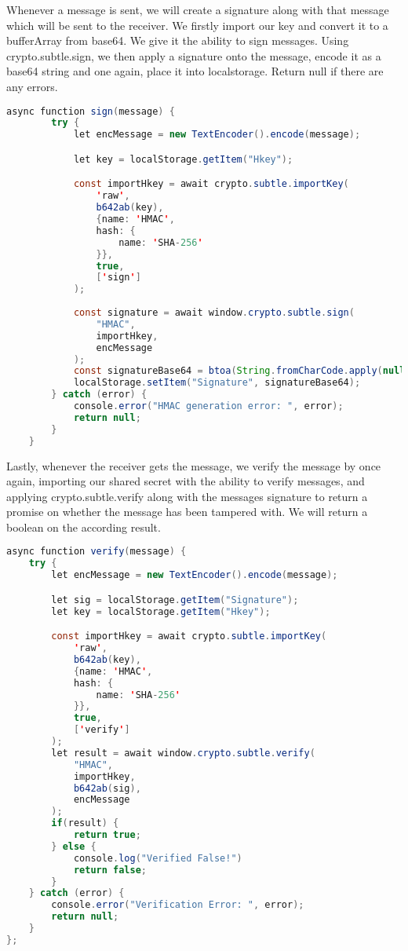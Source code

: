 \documentclass{article}
\begin{document}
Whenever a message is sent, we will create a signature along with that message which will be sent to the receiver. We firstly import our key and convert it to a bufferArray from base64. We give it the ability to sign messages. Using crypto.subtle.sign, we then apply a signature onto the message, encode it as a base64 string and one again, place it into localstorage. Return null if there are any errors.

\begin{lstlisting}[language=Java]
    async function sign(message) {
        try {
            let encMessage = new TextEncoder().encode(message);

            let key = localStorage.getItem("Hkey");

            const importHkey = await crypto.subtle.importKey(
                'raw',
                b642ab(key),
                {name: 'HMAC',
                hash: {
                    name: 'SHA-256'
                }},
                true,
                ['sign']
            );
            
            const signature = await window.crypto.subtle.sign(
                "HMAC",
                importHkey,
                encMessage
            );
            const signatureBase64 = btoa(String.fromCharCode.apply(null, [...new Uint8Array(signature)]));
            localStorage.setItem("Signature", signatureBase64);
        } catch (error) {
            console.error("HMAC generation error: ", error);
            return null; 
        }
    }
\end{lstlisting}


Lastly, whenever the receiver gets the message, we verify the message by once again, importing our shared secret with the ability to verify messages, and applying crypto.subtle.verify along with the messages signature to return a promise on whether the message has been tampered with. We will return a boolean on the according result.

\begin{lstlisting}[language=Java]
async function verify(message) {
    try {
        let encMessage = new TextEncoder().encode(message);

        let sig = localStorage.getItem("Signature");
        let key = localStorage.getItem("Hkey");

        const importHkey = await crypto.subtle.importKey(
            'raw',
            b642ab(key),
            {name: 'HMAC',
            hash: {
                name: 'SHA-256'
            }},
            true,
            ['verify']
        );
        let result = await window.crypto.subtle.verify(
            "HMAC",
            importHkey,
            b642ab(sig),
            encMessage
        );
        if(result) {
            return true;
        } else {
            console.log("Verified False!")
            return false;
        }
    } catch (error) {
        console.error("Verification Error: ", error);
        return null; 
    }
};   
\end{lstlisting}
\end{document}
